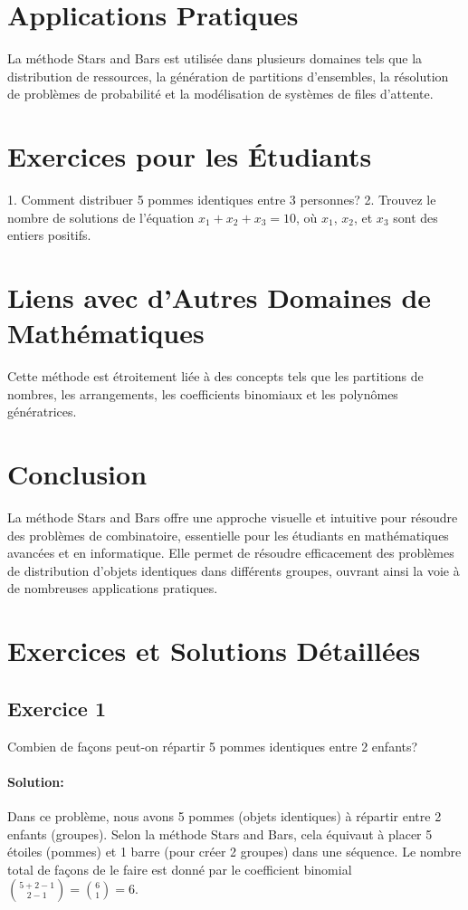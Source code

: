 \documentclass{article}
\begin{document}
\section{Applications Pratiques}
La méthode Stars and Bars est utilisée dans plusieurs domaines tels que la distribution de ressources, la génération de partitions d'ensembles, la résolution de problèmes de probabilité et la modélisation de systèmes de files d'attente.

\section{Exercices pour les Étudiants}
1. Comment distribuer 5 pommes identiques entre 3 personnes?
2. Trouvez le nombre de solutions de l'équation \(x_1 + x_2 + x_3 = 10\), où \(x_1\), \(x_2\), et \(x_3\) sont des entiers positifs.

\section{Liens avec d'Autres Domaines de Mathématiques}
Cette méthode est étroitement liée à des concepts tels que les partitions de nombres, les arrangements, les coefficients binomiaux et les polynômes génératrices.

\section{Conclusion}
La méthode Stars and Bars offre une approche visuelle et intuitive pour résoudre des problèmes de combinatoire, essentielle pour les étudiants en mathématiques avancées et en informatique. Elle permet de résoudre efficacement des problèmes de distribution d'objets identiques dans différents groupes, ouvrant ainsi la voie à de nombreuses applications pratiques.

\newpage

\section{Exercices et Solutions Détaillées}

\subsection{Exercice 1}
Combien de façons peut-on répartir 5 pommes identiques entre 2 enfants?
\paragraph{Solution:}
Dans ce problème, nous avons 5 pommes (objets identiques) à répartir entre 2 enfants (groupes). Selon la méthode Stars and Bars, cela équivaut à placer 5 étoiles (pommes) et 1 barre (pour créer 2 groupes) dans une séquence. Le nombre total de façons de le faire est donné par le coefficient binomial \(\binom{5 + 2 - 1}{2 - 1} = \binom{6}{1} = 6\). 
\end{document}
